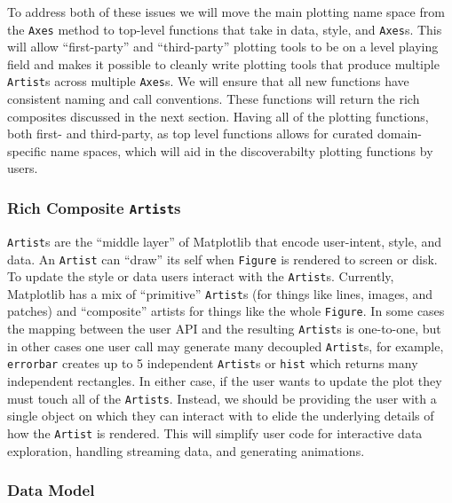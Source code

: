 \documentclass[11pt]{article}  %
\begin{document}
To address both of these issues we will move the main plotting name
space from the \texttt{Axes} method to top-level functions that take in
data, style, and \texttt{Axes}s.
This will allow ``first-party'' and
``third-party'' plotting tools to be on a level playing field and
makes it possible to cleanly write plotting tools that produce
multiple \texttt{Artist}s across multiple \texttt{Axes}s.
We will ensure that all new functions have consistent naming and call
conventions.
These
functions will return the rich composites discussed in the next
section.
Having all of the plotting functions, both first- and third-party, as
top level functions allows for curated domain-specific name spaces,
which will aid in the discoverabilty plotting functions by users.

\subsubsection{Rich Composite \texttt{Artist}s}

\texttt{Artist}s are the ``middle layer'' of Matplotlib that encode
user-intent, style, and data.  An \texttt{Artist} can ``draw'' its
self when \texttt{Figure} is rendered to screen or disk.
To update the style or data users interact with the  \texttt{Artist}s.
Currently, Matplotlib has a mix of ``primitive'' \texttt{Artist}s (for
things like lines, images, and patches) and ``composite'' artists for
things like the whole \texttt{Figure}.
In some cases the mapping between the user API and the resulting
\texttt{Artist}s is one-to-one, but in other cases one user call may
generate many decoupled \texttt{Artist}s, for example,
\texttt{errorbar} creates up to 5 independent \texttt{Artist}s or
\texttt{hist} which returns many independent rectangles.  In either
case, if the user wants to update the plot they must touch all of the
\texttt{Artists}.
Instead, we should be providing the user with a single object on which
they can interact with to elide the underlying details of how the
\texttt{Artist} is rendered.
This will simplify user code for interactive data exploration,
handling streaming data, and generating animations.




\subsubsection{Data Model}
\end{document}
